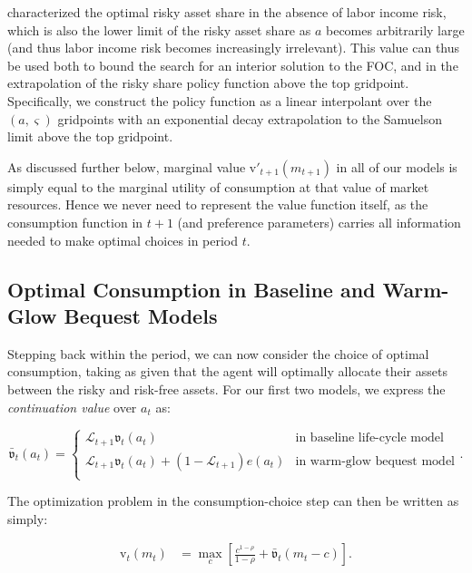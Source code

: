 \documentclass{article}
\newcommand{\CRRA}{\rho}
\newcommand{\vFunc}{\mathrm{v}}
\newcommand{\Alive}{\mathcal{L}}
\newcommand{\cNrm}{c}
\newcommand{\mNrm}{m}
\newcommand{\aNrm}{a}
\begin{document}
\cite{Samuelson1969} characterized the optimal risky asset share in the absence of labor income risk, which is also the lower limit of the risky asset share as $\aNrm$ becomes arbitrarily large (and thus labor income risk becomes increasingly irrelevant). This value can thus be used both to bound the search for an interior solution to the FOC, and in the extrapolation of the risky share policy function above the top gridpoint. Specifically, we construct the policy function as a linear interpolant over the $(\aNrm, \varsigma)$ gridpoints with an exponential decay extrapolation to the Samuelson limit above the top gridpoint.

As discussed further below, marginal value $\vFunc'_{t+1}(\mNrm_{t+1})$ in all of our models is simply equal to the marginal utility of consumption at that value of market resources. Hence we never need to represent the value function itself, as the consumption function in $t+1$ (and preference parameters) carries all information needed to make optimal choices in period $t$.

\subsection{Optimal Consumption in Baseline and Warm-Glow Bequest Models}

Stepping back within the period, we can now consider the choice of optimal consumption, taking as given that the agent will optimally allocate their assets between the risky and risk-free assets. For our first two models, we express the \textit{continuation value} over $\aNrm_t$ as:

\begin{equation}
\bar{\mathfrak{v}}_t(\aNrm_t) = \begin{cases}
\Alive_{t+1} \mathfrak{v}_t(\aNrm_t) & \text{in baseline life-cycle model} \\
\Alive_{t+1} \mathfrak{v}_t(\aNrm_t) + (1 - \Alive_{t+1})e(\aNrm_t) & \text{in warm-glow bequest model} \\
\end{cases}.
\end{equation}

The optimization problem in the consumption-choice step can then be written as simply:

\begin{align}
\vFunc_t(\mNrm_t) &= \max_{\cNrm} \left[ \frac{\cNrm^{1-\CRRA}}{1 - \CRRA} + \bar{\mathfrak{v}}_t(\mNrm_t - \cNrm) \right].
\end{align}
\end{document}
